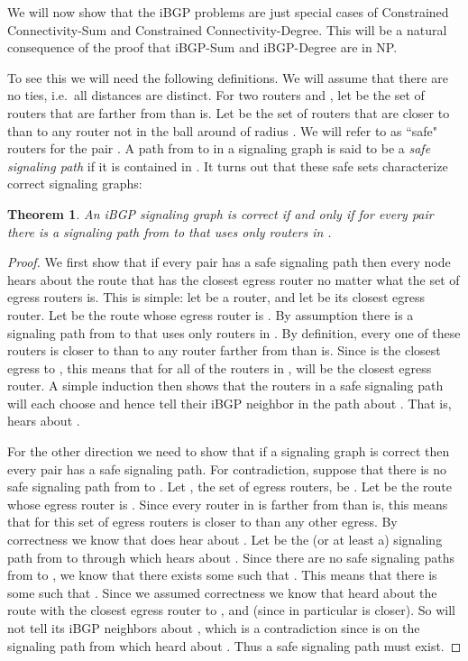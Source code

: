 \documentclass[11pt,letterpaper]{article}
\newtheorem{theorem}{Theorem}[section]
\theoremstyle{definition}
\begin{document}
We will now show that the iBGP problems are just special
cases of {\sc Constrained Connectivity-Sum} and
{\sc Constrained Connectivity-Degree}.  This will be a natural consequence of the proof that {\sc iBGP-Sum} and {\sc iBGP-Degree} are in NP.



  To see this we will need the following definitions.  We
will assume that there are no ties, i.e.\ all distances are distinct.
For two routers  and , let  be
the set of routers that are farther from  than  is.  Let  be the set of
routers that are closer to  than to any router not in the ball
around  of radius .  We will refer to  as ``safe"
routers for the pair .
A path from  to  in a signaling graph is said to be a
{\em safe signaling path} if it is contained in .
It turns out that these safe sets characterize correct signaling graphs:

\begin{theorem} \label{thm:iBGP_safe_sets} An iBGP signaling graph 
  is correct if and only if for every pair 
  there is a signaling path from  to  that uses only routers in
  .
\end{theorem}
\begin{proof}
  We first show that if every pair has a safe signaling path then every
  node hears about the route that has the
  closest egress router no matter what the set of
  egress routers  is.  This is simple: let  be a router, and let  be its
  closest egress router. Let  be the route whose egress router is .
  By assumption there is a signaling path from  to 
  that uses only routers in .  By definition, every one of these
  routers is closer to  than to any router farther from  than 
  is.  Since  is the closest egress to , this means that for all of
  the routers in ,  will be the closest egress router.
  A simple induction then shows that the routers in a safe signaling
  path will each choose  and hence tell their iBGP neighbor in the
  path about .
  That is,  hears about .

  For the other direction we need to show that if a signaling graph
  is correct then every pair has a safe signaling path.  For
  contradiction, suppose that there is no safe signaling path from 
  to .  Let , the set of egress routers, be .  Let  be the route whose egress router is .
  Since every router in  is farther from  than
   is, this means that for this set of egress routers  is closer to 
  than any other egress.  By correctness we know that  does hear about
  .  Let  be the (or at least a)
  signaling path from  to  through which  hears about .
  Since there are no safe signaling paths from  to , we know that
  there exists some  such that .  This means that
  there is some  such that .  Since
  we assumed correctness we know that  heard about the route with
  the closest egress router  to , and 
  (since  in particular is closer).
  So  will not tell its iBGP neighbors about ,
  which is a contradiction since  is
  on the signaling path from which  heard about .  Thus a safe
  signaling path must exist.
\end{proof}
\end{document}
